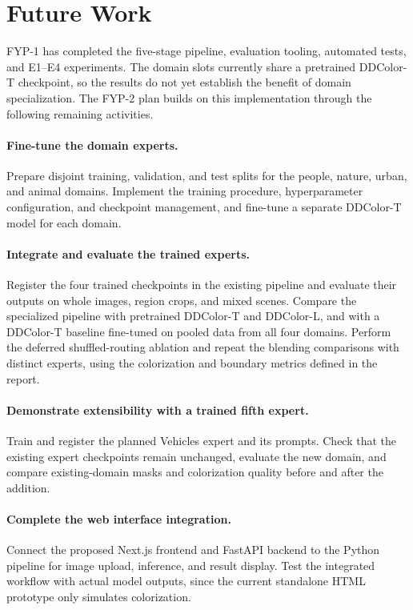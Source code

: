 \documentclass{FastFyp}
\begin{document}
\section{Future Work}
\label{sec:future-work}
FYP-1 has completed the five-stage pipeline, evaluation tooling, automated
tests, and E1--E4 experiments. The domain slots currently share a pretrained
DDColor-T checkpoint, so the results do not yet establish the benefit of
domain specialization. The FYP-2 plan builds on this implementation through
the following remaining activities.

\paragraph{Fine-tune the domain experts.} Prepare disjoint training,
validation, and test splits for the people, nature, urban, and animal domains.
Implement the training procedure, hyperparameter configuration, and checkpoint
management, and fine-tune a separate DDColor-T model for each domain.

\paragraph{Integrate and evaluate the trained experts.} Register the four
trained checkpoints in the existing pipeline and evaluate their outputs on
whole images, region crops, and mixed scenes. Compare the specialized
pipeline with pretrained DDColor-T and DDColor-L, and with a DDColor-T
baseline fine-tuned on pooled data from all four domains. Perform the deferred
shuffled-routing ablation and repeat the blending comparisons with distinct
experts, using the colorization and boundary metrics defined in the report.

\paragraph{Demonstrate extensibility with a trained fifth expert.} Train
and register the planned Vehicles expert and its prompts. Check that the
existing expert checkpoints remain unchanged, evaluate the new domain, and
compare existing-domain masks and colorization quality before and after
the addition.

\paragraph{Complete the web interface integration.} Connect the proposed
Next.js frontend and FastAPI backend to the Python pipeline for image upload,
inference, and result display. Test the integrated workflow with actual model
outputs, since the current standalone HTML prototype only simulates
colorization.
\end{document}
